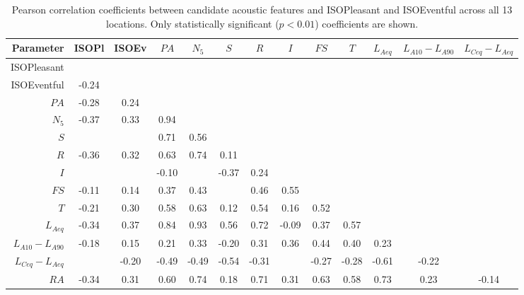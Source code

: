 \begin{table}[ht]
  \caption{Pearson correlation coefficients between candidate acoustic features and ISOPleasant and ISOEventful across all 13 locations. Only statistically significant ($p < 0.01$) coefficients are shown. \label{tab:corr}}
  \centering
  \def\arraystretch{}
    \begin{tabular}{@{}r|cccccccccccc@{}}
      \textbf{Parameter} & ISOPl & ISOEv & $PA$  & $N_5$ & $S$   & $R$   & $I$   & $FS$  & $T$   & $L_{Aeq}$ & $L_{A10}-L_{A90}$ & $L_{Ceq}-L_{Aeq}$ \\
      \midrule
      ISOPleasant        &       &       &       &       &       &       &       &       &       &           &                   &                   \\
      ISOEventful        & -0.24 &       &       &       &       &       &       &       &       &           &                   &                   \\
      $PA$               & -0.28 & 0.24  &       &       &       &       &       &       &       &           &                   &                   \\
      $N_5$              & -0.37 & 0.33  & 0.94  &       &       &       &       &       &       &           &                   &                   \\
      $S$                &       &       & 0.71  & 0.56  &       &       &       &       &       &           &                   &                   \\
      $R$                & -0.36 & 0.32  & 0.63  & 0.74  & 0.11  &       &       &       &       &           &                   &                   \\
      $I$                &       &       & -0.10 &       & -0.37 & 0.24  &       &       &       &           &                   &                   \\
      $FS$               & -0.11 & 0.14  & 0.37  & 0.43  &       & 0.46  & 0.55  &       &       &           &                   &                   \\
      $T$                & -0.21 & 0.30  & 0.58  & 0.63  & 0.12  & 0.54  & 0.16  & 0.52  &       &           &                   &                   \\
      $L_{Aeq}$          & -0.34 & 0.37  & 0.84  & 0.93  & 0.56  & 0.72  & -0.09 & 0.37  & 0.57  &           &                   &                   \\
      $L_{A10}-L_{A90}$  & -0.18 & 0.15  & 0.21  & 0.33  & -0.20 & 0.31  & 0.36  & 0.44  & 0.40  & 0.23      &                   &                   \\
      $L_{Ceq}-L_{Aeq}$  &       & -0.20 & -0.49 & -0.49 & -0.54 & -0.31 &       & -0.27 & -0.28 & -0.61     & -0.22             &                   \\
      $RA$               & -0.34 & 0.31  & 0.60  & 0.74  & 0.18  & 0.71  & 0.31  & 0.63  & 0.58  & 0.73      & 0.23              & -0.14             \\
    \end{tabular}
\end{table}

